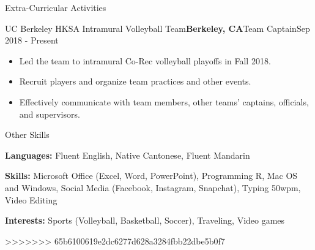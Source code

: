 \documentclass{resume}
\begin{document}

\newpage


\begin{rSection}{Extra-Curricular Activities} 

\begin{rSubsection}{UC Berkeley HKSA Intramural Volleyball Team}{\bf {Berkeley, CA}}{Team Captain}{Sep 2018 - Present}
\begin{itemize}
    \item Led the team to intramural Co-Rec volleyball playoffs in Fall 2018.
    \item Recruit players and organize team practices and other events.
    \item Effectively communicate with team members, other teams’ captains, officials, and supervisors.
\end{itemize}
\end{rSubsection}

\end{rSection}


\begin{rSection}{Other Skills}

{\bf Languages:} Fluent English, Native Cantonese, Fluent Mandarin %
\item {\bf Skills:} Microsoft Office (Excel, Word, PowerPoint), Programming R, Mac OS and Windows, Social Media (Facebook, Instagram, Snapchat), Typing 50wpm, Video Editing %
\item {\bf Interests:} Sports (Volleyball, Basketball, Soccer), Traveling, Video games %

\end{rSection}
>>>>>>> 65b6100619e2dc6277d628a3284fbb22dbe5b0f7
\end{document}
